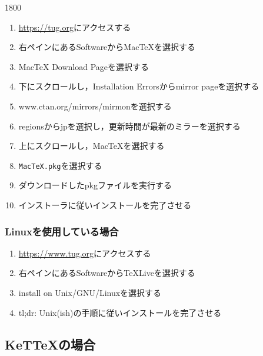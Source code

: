 \begin{layer}{180}{0}
\end{layer}
\begin{enumerate}
    \item \url{https://tug.org}にアクセスする
    \item 右ペインにあるSoftwareからMacTeXを選択する
    \item MacTeX Download Pageを選択する
    \item 下にスクロールし，Installation Errorsからmirror pageを選択する
    \item www.ctan.org/mirrors/mirmonを選択する
    \item regionsからjpを選択し，更新時間が最新のミラーを選択する
    \item 上にスクロールし，MacTeXを選択する
    \item \verb|MacTeX.pkg|を選択する
    \item ダウンロードしたpkgファイルを実行する
    \item インストーラに従いインストールを完了させる
\end{enumerate}

\subsubsection{Linuxを使用している場合}
\begin{enumerate}
    \item \url{https://www.tug.org}にアクセスする
    \item 右ペインにあるSoftwareからTeXLiveを選択する
    \item install on Unix/GNU/Linuxを選択する
    \item tl;dr: Unix(ish)の手順に従いインストールを完了させる
\end{enumerate}

\subsection{KeT{\TeX}の場合}

